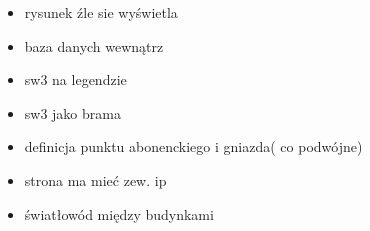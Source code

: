\documentclass{report}
\begin{document}
 \begin{itemize}
\item rysunek źle sie wyświetla
\item baza danych wewnątrz
\item sw3 na legendzie
\item sw3 jako brama
\item definicja punktu abonenckiego i gniazda( co podwójne)
\item strona ma mieć zew. ip
\item światłowód między budynkami

 \end{itemize}
\end{document}
